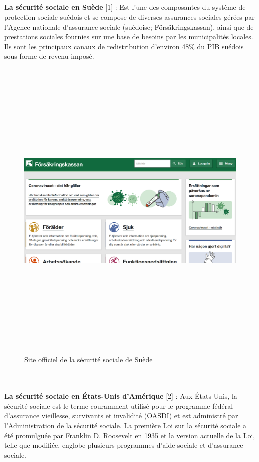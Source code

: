 \subsection*{}
\textbf{La sécurité sociale en Suède} [1] : Est  l’une des composantes du système de protection sociale suédois et se compose de diverses assurances sociales gérées par l’Agence nationale d’assurance sociale (suédoise; Försäkringskassan), ainsi que de prestations sociales fournies sur une base de besoins par les municipalités locales. Ils sont les principaux canaux de redistribution d’environ 48\% du PIB suédois sous forme de revenu imposé.  

\begin{figure}[!h]
  \centering
\includegraphics[width=15cm,height=15cm,keepaspectratio]{figure/seq/socity site of sweed.PNG}
  \caption{Site officiel de la sécurité sociale de Suède}
\end{figure}
\\\\

\textbf{La sécurité sociale en États-Unis d'Amérique} [2] : Aux États-Unis, la sécurité sociale est le terme couramment utilisé pour le programme fédéral d’assurance vieillesse, survivants et invalidité (OASDI) et est administré par l’Administration de la sécurité sociale. La première Loi sur la sécurité sociale a été promulguée par Franklin D. Roosevelt en 1935 et la version actuelle de la Loi, telle que modifiée, englobe plusieurs programmes d’aide sociale et d’assurance sociale.\\

